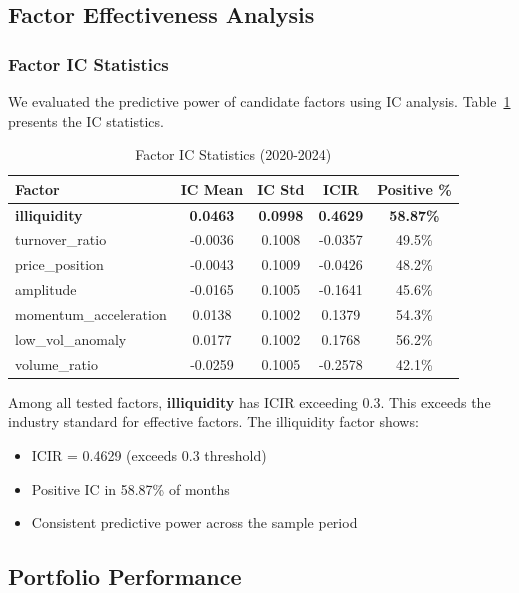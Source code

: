\subsection{Factor Effectiveness Analysis}

\subsubsection{Factor IC Statistics}

We evaluated the predictive power of candidate factors using IC analysis. Table~\ref{tab:factor_ic} presents the IC statistics.

\begin{table}[htbp]
\centering
\caption{Factor IC Statistics (2020-2024)}
\label{tab:factor_ic}
\begin{tabular}{lcccc}
\hline
Factor & IC Mean & IC Std & ICIR & Positive \% \\
\hline
\textbf{illiquidity} & \textbf{0.0463} & \textbf{0.0998} & \textbf{0.4629} & \textbf{58.87\%} \\
turnover\_ratio & -0.0036 & 0.1008 & -0.0357 & 49.5\% \\
price\_position & -0.0043 & 0.1009 & -0.0426 & 48.2\% \\
amplitude & -0.0165 & 0.1005 & -0.1641 & 45.6\% \\
momentum\_acceleration & 0.0138 & 0.1002 & 0.1379 & 54.3\% \\
low\_vol\_anomaly & 0.0177 & 0.1002 & 0.1768 & 56.2\% \\
volume\_ratio & -0.0259 & 0.1005 & -0.2578 & 42.1\% \\
\hline
\end{tabular}
\end{table}

Among all tested factors, \textbf{illiquidity} has ICIR exceeding 0.3. This exceeds the industry standard for effective factors. The illiquidity factor shows:
\begin{itemize}
    \item ICIR = 0.4629 (exceeds 0.3 threshold)
    \item Positive IC in 58.87\% of months
    \item Consistent predictive power across the sample period
\end{itemize}

\subsection{Portfolio Performance}

